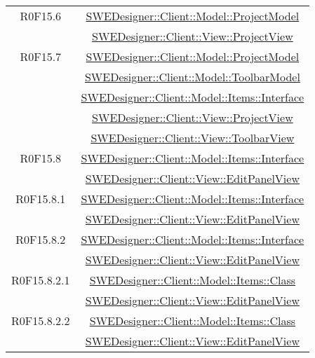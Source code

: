 \documentclass[../DefinizioneDiProdotto.tex]{subfiles}
\begin{document}
\begin{longtable}{|c|c|}
				R0F15.6
				& \hyperlink{SWEDesigner::Client::Model::ProjectModel}{SWEDesigner::Client::Model::ProjectModel}\\
				& \hyperlink{SWEDesigner::Client::View::ProjectView}{SWEDesigner::Client::View::ProjectView}\\
				\hline

				R0F15.7
				& \hyperlink{SWEDesigner::Client::Model::ProjectModel}{SWEDesigner::Client::Model::ProjectModel}\\
				& \hyperlink{SWEDesigner::Client::Model::ToolbarModel}{SWEDesigner::Client::Model::ToolbarModel}\\
				& \hyperlink{SWEDesigner::Client::Model::Items::Interface}{SWEDesigner::Client::Model::Items::Interface}\\
				& \hyperlink{SWEDesigner::Client::View::ProjectView}{SWEDesigner::Client::View::ProjectView}\\
				& \hyperlink{SWEDesigner::Client::View::ToolbarView}{SWEDesigner::Client::View::ToolbarView}\\
				\hline

				R0F15.8
				& \hyperlink{SWEDesigner::Client::Model::Items::Interface}{SWEDesigner::Client::Model::Items::Interface}\\
				& \hyperlink{SWEDesigner::Client::View::EditPanelView}{SWEDesigner::Client::View::EditPanelView}\\
				\hline

				R0F15.8.1
				& \hyperlink{SWEDesigner::Client::Model::Items::Interface}{SWEDesigner::Client::Model::Items::Interface}\\
				& \hyperlink{SWEDesigner::Client::View::EditPanelView}{SWEDesigner::Client::View::EditPanelView}\\
				\hline

				R0F15.8.2
				& \hyperlink{SWEDesigner::Client::Model::Items::Interface}{SWEDesigner::Client::Model::Items::Interface}\\
				& \hyperlink{SWEDesigner::Client::View::EditPanelView}{SWEDesigner::Client::View::EditPanelView}\\
				\hline

				R0F15.8.2.1
				& \hyperlink{SWEDesigner::Client::Model::Items::Class}{SWEDesigner::Client::Model::Items::Class}\\
				& \hyperlink{SWEDesigner::Client::View::EditPanelView}{SWEDesigner::Client::View::EditPanelView}\\
				\hline

				R0F15.8.2.2
				& \hyperlink{SWEDesigner::Client::Model::Items::Class}{SWEDesigner::Client::Model::Items::Class}\\
				& \hyperlink{SWEDesigner::Client::View::EditPanelView}{SWEDesigner::Client::View::EditPanelView}\\
				\hline


\end{longtable}
\end{document}
